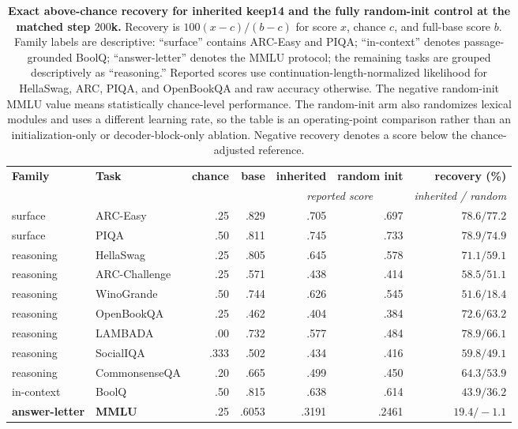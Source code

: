 \begin{table}[t]
\centering
\small
\setlength{\tabcolsep}{4.5pt}
\begin{tabular}{@{}llrrrrr@{}}
\toprule
\textbf{Family} & \textbf{Task} & \textbf{chance} & \textbf{base} &
\textbf{inherited} & \textbf{random init} & \textbf{recovery (\%)} \\
& & & & \multicolumn{2}{c}{\textit{reported score}} &
\textit{inherited / random} \\
\midrule
surface & ARC-Easy & .25 & .829 & .705 & .697 & $78.6 / 77.2$ \\
surface & PIQA & .50 & .811 & .745 & .733 & $78.9 / 74.9$ \\
\midrule
reasoning & HellaSwag & .25 & .805 & .645 & .578 & $71.1 / 59.1$ \\
reasoning & ARC-Challenge & .25 & .571 & .438 & .414 & $58.5 / 51.1$ \\
reasoning & WinoGrande & .50 & .744 & .626 & .545 & $51.6 / 18.4$ \\
reasoning & OpenBookQA & .25 & .462 & .404 & .384 & $72.6 / 63.2$ \\
reasoning & LAMBADA & .00 & .732 & .577 & .484 & $78.9 / 66.1$ \\
reasoning & SocialIQA & .333 & .502 & .434 & .416 & $59.8 / 49.1$ \\
reasoning & CommonsenseQA & .20 & .665 & .499 & .450 & $64.3 / 53.9$ \\
\midrule
in-context & BoolQ & .50 & .815 & .638 & .614 & $43.9 / 36.2$ \\
\textbf{answer-letter} & \textbf{MMLU} & .25 & .6053 & .3191 & .2461 &
$\mathbf{19.4 / -1.1}$ \\
\bottomrule
\end{tabular}
\caption{\textbf{Exact above-chance recovery for inherited keep14 and the
fully random-init control at the matched step $200$k.}
Recovery is $100(x-c)/(b-c)$ for score $x$, chance $c$, and full-base score
$b$. Family labels are descriptive: ``surface'' contains ARC-Easy and PIQA;
``in-context'' denotes passage-grounded BoolQ; ``answer-letter'' denotes the
MMLU protocol; the remaining tasks are grouped descriptively as ``reasoning.'' Reported scores use continuation-length-normalized likelihood for
HellaSwag, ARC, PIQA, and OpenBookQA and raw accuracy otherwise. The negative
random-init MMLU value means statistically chance-level performance. The random-init arm also randomizes lexical modules and uses a different learning
rate, so the table is an operating-point comparison rather than an
initialization-only or decoder-block-only ablation. Negative recovery denotes a
score below the chance-adjusted reference.}
\label{tab:app-recovery}
\end{table}
